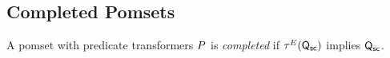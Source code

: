 


\subsection{Completed Pomsets}

\begin{definition}
  A pomset with predicate transformers $P$ is \emph{completed} if
  $\aTr{\aEvs}{\Q{\mSC}}$ implies $\mathsf{Q}_{{\mathsf{sc}}}$.
\end{definition}



